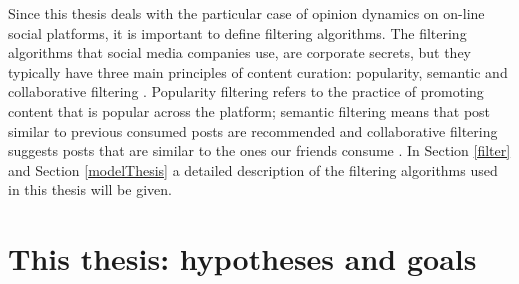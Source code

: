 \documentclass[11 pt , letterpaper , twoside , openright]{book}
\begin{document}
Since this thesis deals with the particular case of opinion dynamics on on-line social platforms, it is important to define filtering algorithms. The filtering algorithms that social media companies use, are corporate secrets, but they typically have three main principles of content curation: popularity, semantic and collaborative filtering \cite{Perra2019}. Popularity filtering refers to the practice of promoting content that is popular across the platform; semantic filtering means that post similar to previous consumed posts are recommended and collaborative filtering suggests posts that are similar to the ones our friends consume \cite{Perra2019}. In Section \ref{filter} and Section \ref{modelThesis} a detailed description of the filtering algorithms used in this thesis will be given.
\newpage
\section{This thesis: hypotheses and goals}\label{goal}
\end{document}

